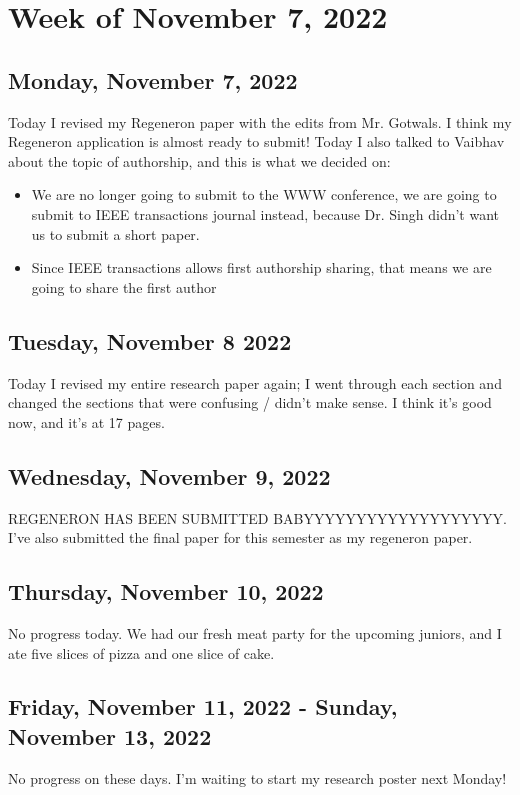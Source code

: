 \documentclass[11pt,letterpaper]{article}
\begin{document}
\section{Week of November 7, 2022}
\subsection{Monday, November 7, 2022}
Today I revised my Regeneron paper with the edits from Mr. Gotwals. I think my Regeneron application is almost ready to submit! Today I also talked to Vaibhav about the topic of authorship, and this is what we decided on:
\begin{itemize}
    \item We are no longer going to submit to the WWW conference, we are going to submit to IEEE transactions journal instead, because Dr. Singh didn't want us to submit a short paper.
    \item Since IEEE transactions allows first authorship sharing, that means we are going to share the first author
\end{itemize}

\subsection{Tuesday, November 8 2022}
Today I revised my entire research paper again; I went through each section and changed the sections that were confusing / didn't make sense. I think it's good now, and it's at 17 pages. 

\subsection{Wednesday, November 9, 2022}
REGENERON HAS BEEN SUBMITTED BABYYYYYYYYYYYYYYYYYYY. I've also submitted the final paper for this semester as my regeneron paper.

\subsection{Thursday, November 10, 2022}
No progress today. We had our fresh meat party for the upcoming juniors, and I ate five slices of pizza and one slice of cake.

\subsection{Friday, November 11, 2022 - Sunday, November 13, 2022}
No progress on these days. I'm waiting to start my research poster next Monday!
\end{document}
